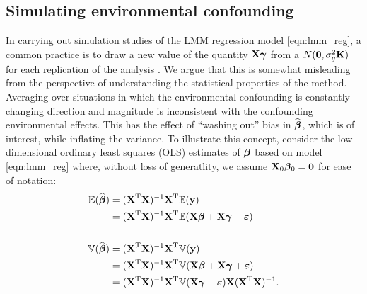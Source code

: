 \subsection{Simulating environmental confounding}

In carrying out simulation studies of the LMM regression model \eqref{eqn:lmm_reg}, a common practice is to draw a new value of the quantity $\textbf{X}\boldsymbol{\gamma}$ from a $N(\boldsymbol{0}, \sigma^2_g \textbf{K})$ for each replication of the analysis \citep{Rakitsch2012, bhatnagar2019simultaneous}.  We argue that this is somewhat misleading from the perspective of understanding the statistical properties of the method. Averaging over situations in which the environmental confounding is constantly changing direction and magnitude is inconsistent with the confounding environmental effects. This has the effect of ``washing out'' bias in $\widehat{\boldsymbol{\beta}{}}$, which is of interest, while inflating the variance. To illustrate this concept, consider the low-dimensional ordinary least squares (OLS) estimates of $\boldsymbol{\beta}{}$ based on model \eqref{eqn:lmm_reg} where, without loss of generatlity, we assume $\textbf{X}_0 \boldsymbol{\beta}{}_0 = \boldsymbol{0}$ for ease of notation: 
\begin{align}
    \mathbb{E}(\widehat{\boldsymbol{\beta}{}}) &= (\textbf{X}^{\text{T}} \textbf{X})^{-1} \textbf{X}^{\text{T}} \mathbb{E}(\textbf{y}) \notag \\
    &=  (\textbf{X}^{\text{T}} \textbf{X})^{-1} \textbf{X}^{\text{T}} \mathbb{E}(\textbf{X}\boldsymbol{\beta}{} + \textbf{X}\boldsymbol{\gamma} + \boldsymbol{\varepsilon}{}) \label{eqn:expectation}\\
    &\quad \notag\\
    \mathbb{V}(\widehat{\boldsymbol{\beta}{}}) &= (\textbf{X}^{\text{T}} \textbf{X})^{-1} \textbf{X}^{\text{T}} \mathbb{V}(\textbf{y}) \notag\\
    &=  (\textbf{X}^{\text{T}} \textbf{X})^{-1} \textbf{X}^{\text{T}} \mathbb{V}(\textbf{X}\boldsymbol{\beta}{} + \textbf{X}\boldsymbol{\gamma} + \boldsymbol{\varepsilon}{}) \notag\\
    &=  (\textbf{X}^{\text{T}} \textbf{X})^{-1} \textbf{X}^{\text{T}} \mathbb{V}(\textbf{X}\boldsymbol{\gamma} + \boldsymbol{\varepsilon}{}) \textbf{X}  (\textbf{X}^{\text{T}} \textbf{X})^{-1} \label{eqn:variance}.
\end{align}
